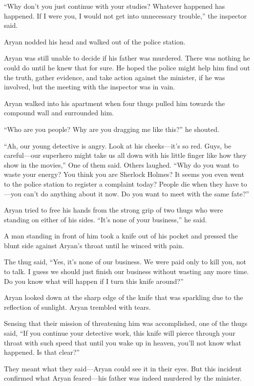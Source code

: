 “Why don't you just continue with your studies? Whatever happened has happened.
If I were you, I would not get into unnecessary trouble,” the inspector said.

Aryan nodded his head and walked out of the police station.

Aryan was still unable to decide if his father was murdered. There was nothing
he could do until he knew that for sure. He hoped the police might help him find
out the truth, gather evidence, and take action against the minister, if he was
involved, but the meeting with the inspector was in vain.

Aryan walked into his apartment when four thugs pulled him towards the compound
wall and surrounded him.

“Who are you people? Why are you dragging me like this?” he shouted.

“Ah, our young detective is angry. Look at his cheeks—it's so red. Guys, be
careful—our superhero might take us all down with his little finger like how
they show in the movies,” One of them said. Others laughed. “Why do you want to
waste your energy? You think you are Sherlock Holmes? It seems you even went to
the police station to register a complaint today? People die when they have
to—you can't do anything about it now. Do you want to meet with the same fate?”

Aryan tried to free his hands from the strong grip of two thugs who were
standing on either of his sides. “It's none of your business,” he said.

A man standing in front of him took a knife out of his pocket and pressed the
blunt side against Aryan's throat until he winced with pain.

The thug said, “Yes, it's none of our business. We were paid only to kill you,
not to talk. I guess we should just finish our business without wasting any more
time. Do you know what will happen if I turn this knife around?”

Aryan looked down at the sharp edge of the knife that was sparkling due to the
reflection of sunlight. Aryan trembled with tears.

Sensing that their mission of threatening him was accomplished, one of the thugs
said, “If you continue your detective work, this knife will pierce through your
throat with such speed that until you wake up in heaven, you'll not know what
happened. Is that clear?”

They meant what they said—Aryan could see it in their eyes. But this incident
confirmed what Aryan feared—his father was indeed murdered by the minister.